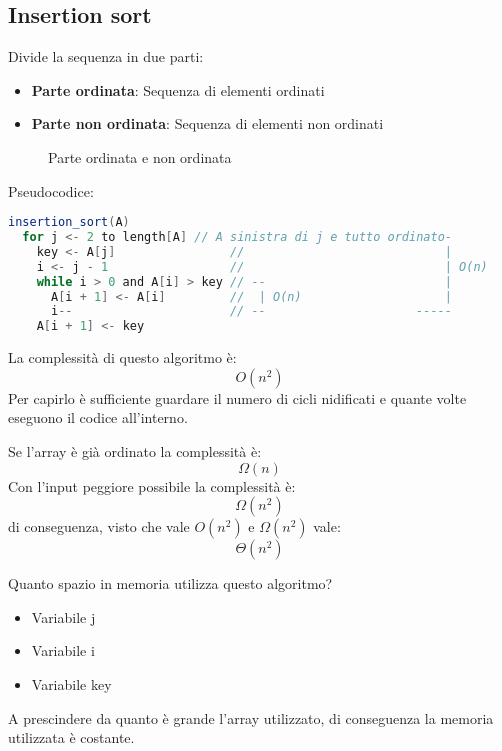 \documentclass[a4paper]{article}
\begin{document}
\subsection{Insertion sort}
Divide la sequenza in due parti:
\begin{itemize}
  \item \textbf{Parte ordinata}: Sequenza di elementi ordinati
  \item \textbf{Parte non ordinata}: Sequenza di elementi non ordinati
\end{itemize}
\begin{figure}[H]
  \centering
  \caption{Parte ordinata e non ordinata}
\end{figure}

\noindent
Pseudocodice:
\begin{lstlisting}[language=Scala]
insertion_sort(A)
  for j <- 2 to length[A] // A sinistra di j e tutto ordinato-
    key <- A[j]                //                            |
    i <- j - 1                 //                            | O(n)
    while i > 0 and A[i] > key // --                         |
      A[i + 1] <- A[i]         //  | O(n)                    |
      i--                      // --                     -----
    A[i + 1] <- key            
\end{lstlisting}

\noindent
La complessità di questo algoritmo è:
\[
  O(n^2)
\] 
Per capirlo è sufficiente guardare il numero di cicli nidificati e quante volte eseguono
il codice all'interno.

\vspace{1em}
\noindent
Se l'array è già ordinato la complessità è:
\[
\Omega(n)
\] 
Con l'input peggiore possibile la complessità è:
\[
\Omega(n^2)
\]
di conseguenza, visto che vale \( O(n^2) \) e \( \Omega(n^2) \) vale:
\[
\Theta(n^2)
\] 

Quanto spazio in memoria utilizza questo algoritmo?
\begin{itemize}
  \item Variabile j
  \item Variabile i
  \item Variabile key
\end{itemize}
A prescindere da quanto è grande l'array utilizzato, di conseguenza la memoria utilizzata
è costante.
\end{document}

